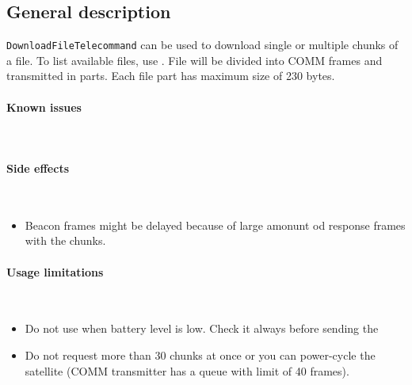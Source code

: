

\subsection{General description}
\texttt{DownloadFileTelecommand} can be used to download single or multiple chunks of a file.  To list available files, use . File will be divided into COMM frames and transmitted in parts. Each file part has maximum size of 230 bytes.

\paragraph{Known issues} \mbox{} \\
\None

\paragraph{Side effects} \mbox{} \\
\begin{itemize}
    \item Beacon frames might be delayed because of large amonunt od response frames with the chunks. 
\end{itemize}

\paragraph{Usage limitations} \mbox{} \\
\begin{itemize}
    \item Do not use when battery level is low. Check it always before sending the 
    \item Do not request more than 30 chunks at once or you can power-cycle the satellite (COMM transmitter has a queue with limit of 40 frames).
\end{itemize}

